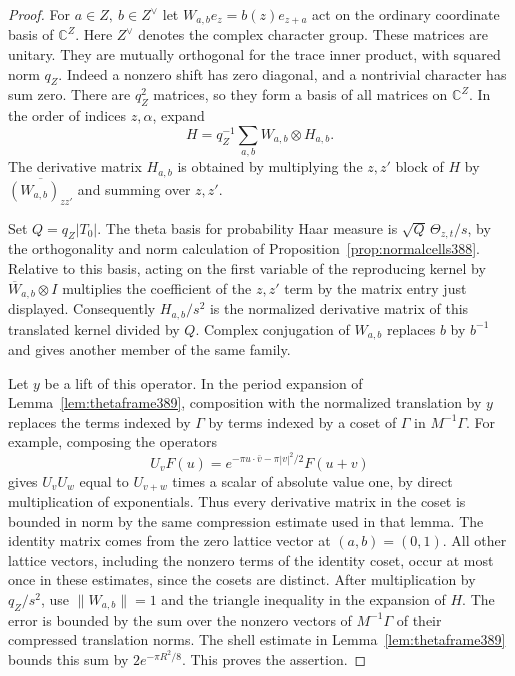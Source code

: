 \documentclass[a4paper,11pt]{article}
\theoremstyle{definition}
\theoremstyle{remark}
\numberwithin{equation}{section}
\begin{document}
\begin{proof}
For \(a\in Z,\ b\in Z^\vee\) let
\(W_{a,b}e_z=b(z)e_{z+a}\) act on the ordinary coordinate
basis of \(\mathbb C^Z\). Here \(Z^\vee\) denotes the complex
character group. These matrices are unitary. They are mutually
orthogonal for the trace inner product, with squared norm \(q_Z\).
Indeed a nonzero shift has zero diagonal, and a nontrivial
character has sum zero. There are \(q_Z^2\) matrices, so they
form a basis of all matrices on \(\mathbb C^Z\). In the order
of indices \(z,\alpha\), expand
\[
 H=q_Z^{-1}\sum_{a,b} W_{a,b}\otimes H_{a,b}.
\]
The derivative matrix \(H_{a,b}\) is obtained by multiplying
the \(z,z'\) block of \(H\) by
\(\overline{(W_{a,b})_{zz'}}\) and summing over \(z,z'\).

Set \(Q=q_Z|T_0|\). The theta basis for probability Haar
measure is \(\sqrt Q\,\Theta_{z,t}/s\), by the
orthogonality and norm calculation of
Proposition~\ref{prop:normalcells388}. Relative to this basis,
acting on the first variable of the reproducing kernel by
\(\overline W_{a,b}\otimes I\) multiplies the coefficient of
the \(z,z'\) term by the matrix entry just displayed.
Consequently \(H_{a,b}/s^2\) is the normalized derivative matrix
of this translated kernel divided by \(Q\). Complex conjugation
of \(W_{a,b}\) replaces \(b\) by \(b^{-1}\) and gives another
member of the same family.

Let \(y\) be a lift of this operator. In the period expansion
of Lemma~\ref{lem:thetaframe389}, composition with the normalized
translation by \(y\) replaces the terms indexed by \(\Gamma\)
by terms indexed by a coset of \(\Gamma\) in \(M^{-1}\Gamma\).
For example, composing the operators
\[
     U_vF(u)=e^{-\pi u\cdot\bar v-\pi|v|^2/2}F(u+v)
\]
gives \(U_vU_w\) equal to \(U_{v+w}\) times a scalar of
absolute value one, by direct multiplication of exponentials.
Thus every derivative matrix in the coset is bounded in norm by
the same compression estimate used in that lemma. The identity
matrix comes from the zero lattice vector at \((a,b)=(0,1)\).
All other lattice vectors, including the nonzero terms of the
identity coset, occur at most once in these estimates, since
the cosets are distinct.
After multiplication by \(q_Z/s^2\), use \(\|W_{a,b}\|=1\)
and the triangle inequality in the expansion of \(H\).
The error is bounded by the sum over the nonzero vectors of
\(M^{-1}\Gamma\) of their compressed translation norms.
The shell estimate in Lemma~\ref{lem:thetaframe389} bounds this
sum by \(2e^{-\pi R^2/8}\). This proves the assertion.
\end{proof}
\end{document}
